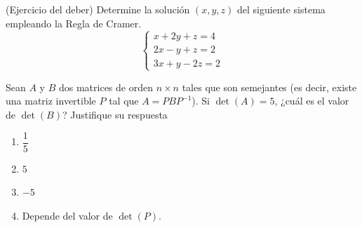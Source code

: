 \documentclass[10pt,a4]{examenEPN0}
\begin{document}
\begin{preguntas}

\item (Ejercicio del deber)  Determine la solución $(x, y, z)$ del siguiente sistema empleando la Regla de Cramer.  
$$
\begin{cases} x + 2y + z = 4 \\ 2x - y + z = 2 \\ 3x + y - 2z = 2 \end{cases}
$$


\item  Sean $A$ y $B$ dos matrices de orden $n \times n$ tales que son semejantes (es decir, existe una matriz invertible $P$ tal que $A = P B P^{-1}$). Si $\det(A) = 5$, ¿cuál es el valor de $\det(B)$? 
Justifique su respuesta 
    \begin{enumerate}[label=(\alph*), itemsep=2pt]
        \item $\dfrac{1}{5}$
        \item $5$
        \item $-5$
        \item Depende del valor de $\det(P)$.
    \end{enumerate}   
    
\end{preguntas}
\final
\end{document}
